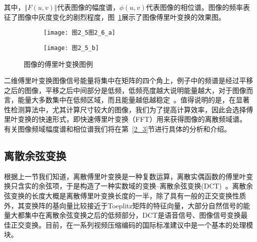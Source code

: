 其中，$\Vert F(u,v)\Vert$代表图像的幅度谱，$\phi(u,v)$代表图像的相位谱。图像的频率表征了图像中灰度变化的剧烈程度，图~\ref{图2_5}展示了图像傅里叶变换的效果图。
\begin{figure}[t]
  \centering%
  \begin{subfigure}{3cm}
    \texttt{[image: 图2\_5图2\_6\_a]}
  \end{subfigure}
  \hspace{4em}%
  \begin{subfigure}{0.25\textwidth}
    \texttt{[image: 图2\_5\_b]}
  \end{subfigure}
  \caption{图像的傅里叶变换图例}
  \label{图2_5} 
\end{figure}

二维傅里叶变换图像信号能量将集中在矩阵的四个角上，例子中的频谱是经过平移之后的图像，平移之后中间部分是低频，低频亮度越大说明能量越大，对于图像而言，能量大多数集中在低频区域，而且能量越低越稳定~\cite{Gonzalez2005book}。值得说明的是，在显著性检测算法中，尤其计算尺寸较大的图像，我们为了提高计算效率，因此会选择傅里叶变换的快速形式，即快速傅里叶变换（FFT）用来获得图像的离散频域谱。有关图像频域幅度谱和相位谱我们将在第~\ref{2_3}节进行具体的分析和介绍。

\subsection{离散余弦变换}
\label{2_2_2}

根据上一节我们知道，离散傅里叶变换是一种复数运算，离散实偶函数的傅里叶变换只含实的余弦项，于是构造了一种实数域的变换--离散余弦变换(DCT)~\cite{Rao2014book}。离散余弦变换的长度大概是离散傅里叶变换长度的一半，除了具有一般的正交变换性质外，其变换阵的基向量比较接近于Toeplitz矩阵的特征向量，大部分自然信号的能量大都集中在离散余弦变换之后的低频部分，DCT是语音信号、图像信号变换最佳正交变换。目前，在一系列视频压缩编码的国际标准建议中是一个基本的处理模块。

